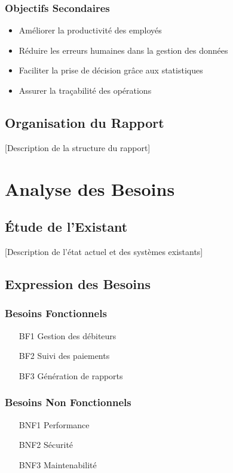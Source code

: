 \documentclass[12pt,a4paper]{report}
\begin{document}
\subsection{Objectifs Secondaires}
\begin{itemize}
    \item Améliorer la productivité des employés
    \item Réduire les erreurs humaines dans la gestion des données
    \item Faciliter la prise de décision grâce aux statistiques
    \item Assurer la traçabilité des opérations
\end{itemize}

\section{Organisation du Rapport}
[Description de la structure du rapport]

\chapter{Analyse des Besoins}
\section{Étude de l'Existant}
[Description de l'état actuel et des systèmes existants]

\section{Expression des Besoins}
\subsection{Besoins Fonctionnels}
\begin{itemize}
    \item [BF1] Gestion des débiteurs
    \item [BF2] Suivi des paiements
    \item [BF3] Génération de rapports
\end{itemize}

\subsection{Besoins Non Fonctionnels}
\begin{itemize}
    \item [BNF1] Performance
    \item [BNF2] Sécurité
    \item [BNF3] Maintenabilité
\end{itemize}
\end{document}
